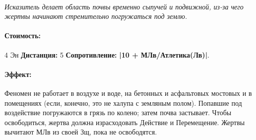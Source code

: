 \paragraph{} 
\textit{Исказитель делает область почвы временно сыпучей и подвижной, из-за чего жертвы начинают стремительно погружаться под землю.}
\paragraph{Стоимость: }4 Эн
\newline
\textbf{Дистанция: }5
\newline
\textbf{Сопротивление: }
\textbf{|10 + МЛв/Атлетика(Лв)|}.
\paragraph{Эффект: }Феномен не работает в воздухе и воде, на бетонных и асфальтовых мостовых и в помещениях (если, конечно, это не халупа с земляным полом). 
\newline Попавшие под воздействие погружаются в грязь по колено; затем почва застывает. Чтобы освободиться, жертва должна израсходовать Действие и Перемещение. 
\newline Жертвы вычитают МЛв из своей Зщ, пока не освободятся.
